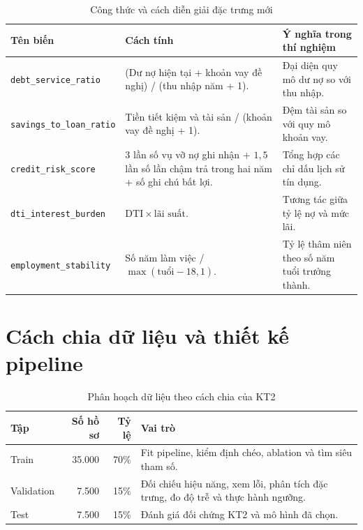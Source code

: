 \documentclass[12pt,a4paper,oneside]{report}
\begin{document}
\begin{table}[H]
  \caption{Công thức và cách diễn giải đặc trưng mới}
  \label{tab:features}
  \begin{tabularx}{\textwidth}{|>{\raggedright\arraybackslash}p{4.0cm}|>{\raggedright\arraybackslash}X|>{\raggedright\arraybackslash}p{4.0cm}|}
    \hline
    \textbf{Tên biến} & \textbf{Cách tính} & \textbf{Ý nghĩa trong thí nghiệm} \\
    \hline
    \texttt{debt\_\allowbreak service\_\allowbreak ratio} &
    (Dư nợ hiện tại + khoản vay đề nghị) / (thu nhập năm + 1). &
    Đại diện quy mô dư nợ so với thu nhập. \\ \hline
    \texttt{savings\_\allowbreak to\_\allowbreak loan\_\allowbreak ratio} &
    Tiền tiết kiệm và tài sản / (khoản vay đề nghị + 1). &
    Đệm tài sản so với quy mô khoản vay. \\ \hline
    \texttt{credit\_\allowbreak risk\_\allowbreak score} &
    $3$ lần số vụ vỡ nợ ghi nhận + $1{,}5$ lần số lần chậm trả trong hai năm + số ghi chú bất lợi. &
    Tổng hợp các chỉ dấu lịch sử tín dụng. \\ \hline
    \texttt{dti\_\allowbreak interest\_\allowbreak burden} &
    $\mathrm{DTI}\times\text{lãi suất}$. &
    Tương tác giữa tỷ lệ nợ và mức lãi. \\ \hline
    \texttt{employment\_\allowbreak stability} &
    Số năm làm việc / $\max(\text{tuổi}-18, 1)$. &
    Tỷ lệ thâm niên theo số năm tuổi trưởng thành. \\ \hline
  \end{tabularx}
\end{table}

\section{Cách chia dữ liệu và thiết kế pipeline}

\begin{table}[H]
  \caption{Phân hoạch dữ liệu theo cách chia của KT2}
  \label{tab:splits}
  \begin{tabularx}{\textwidth}{|l|r|r|X|}
    \hline
    \textbf{Tập} & \textbf{Số hồ sơ} & \textbf{Tỷ lệ} & \textbf{Vai trò} \\
    \hline
    Train & 35.000 & 70\% & Fit pipeline, kiểm định chéo, ablation và tìm siêu tham số. \\ \hline
    Validation & 7.500 & 15\% & Đối chiếu hiệu năng, xem lỗi, phân tích đặc trưng, đo độ trễ và thực hành ngưỡng. \\ \hline
    Test & 7.500 & 15\% & Đánh giá đối chứng KT2 và mô hình đã chọn. \\ \hline
  \end{tabularx}
\end{table}
\end{document}
